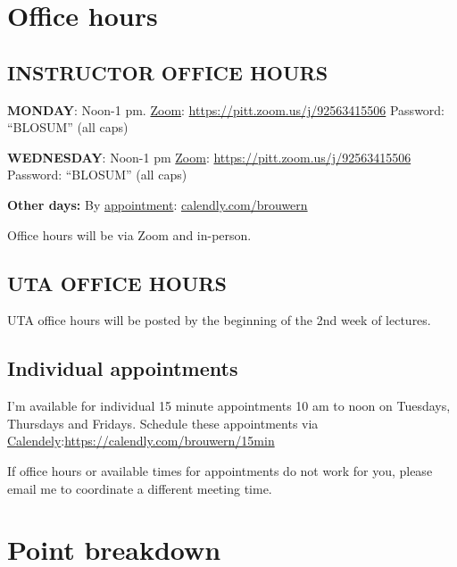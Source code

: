 \documentclass[
]{book}
\begin{document}
\hypertarget{office-hours}{%
\chapter{Office hours}\label{office-hours}}

\hypertarget{instructor-office-hours}{%
\section{INSTRUCTOR OFFICE HOURS}\label{instructor-office-hours}}

\textbf{MONDAY}: Noon-1 pm.
\href{https://pitt.zoom.us/j/92563415506}{Zoom}: \url{https://pitt.zoom.us/j/92563415506}
Password: ``BLOSUM'' (all caps)

\textbf{WEDNESDAY}: Noon-1 pm
\href{https://pitt.zoom.us/j/92563415506}{Zoom}: \url{https://pitt.zoom.us/j/92563415506}
Password: ``BLOSUM'' (all caps)

\textbf{Other days:} By \href{www.calendly.com/brouwern}{appointment}: \href{www.calendly.com/brouwern}{calendly.com/brouwern}

Office hours will be via Zoom and in-person.

\hypertarget{uta-office-hours}{%
\section{UTA OFFICE HOURS}\label{uta-office-hours}}

UTA office hours will be posted by the beginning of the 2nd week of lectures.

\hypertarget{individual-appointments}{%
\section{Individual appointments}\label{individual-appointments}}

I'm available for individual 15 minute appointments 10 am to noon on Tuesdays, Thursdays and Fridays. Schedule these appointments via \href{https://calendly.com/brouwern/15min}{Calendely}:\url{https://calendly.com/brouwern/15min}

If office hours or available times for appointments do not work for you, please email me to coordinate a different meeting time.

\hypertarget{points}{%
\chapter{Point breakdown}\label{points}}
\end{document}
